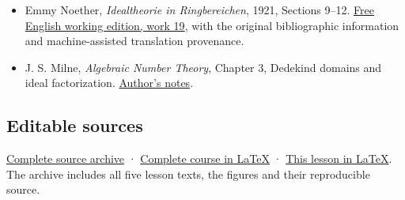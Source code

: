 \documentclass[
]{article}
\providecommand{\tightlist}{%
  \setlength{\itemsep}{0pt}\setlength{\parskip}{0pt}}
\begin{document}
\begin{itemize}
\tightlist
\item
  Emmy Noether, \emph{Idealtheorie in Ringbereichen}, 1921, Sections
  9--12.
  \href{https://github.com/KokunoYumeto/emmy-noether-en/blob/main/source/Noether_English_ED0014.tex}{Free
  English working edition, work 19}, with the original bibliographic
  information and machine-assisted translation provenance.
\item
  J. S. Milne, \emph{Algebraic Number Theory}, Chapter 3, Dedekind
  domains and ideal factorization.
  \href{https://www.jmilne.org/math/CourseNotes/ANT.pdf}{Author's
  notes}.
\end{itemize}

\subsection{Editable sources}\label{editable-sources}

\href{ideal-theory-in-rings-source.zip}{Complete source archive} ·
\href{ideal-theory-in-rings.tex}{Complete course in LaTeX} ·
\href{NOE-IDL-03.tex}{This lesson in LaTeX}. The archive includes all
five lesson texts, the figures and their reproducible source.
\end{document}
